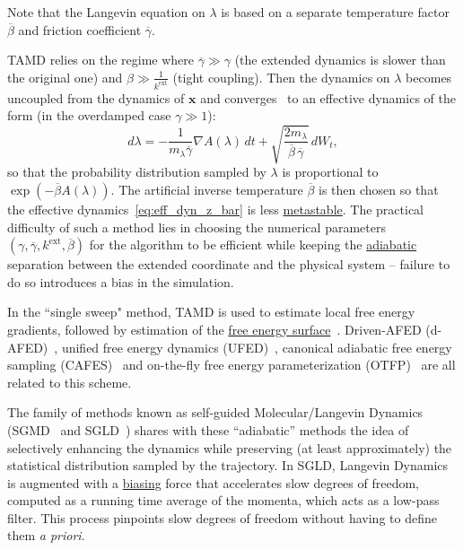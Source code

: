 \documentclass[9pt,review]{livecoms}
\newcommand{\vx}{\mathbf{x}}
\begin{document}
Note that the Langevin equation on $\lambda$ is based on a separate temperature factor $\overline \beta$ and friction coefficient $\overline{\gamma}$.

TAMD relies on the regime where $\overline{\gamma} \gg \gamma$ (the extended dynamics is slower than the original one) and $\beta \gg \frac{1}{k^\mathrm{ext}}$ (tight coupling). Then the dynamics on $\lambda$ becomes uncoupled from the dynamics of $\vx$ and converges~\cite{MV06} to an effective dynamics of the form (in the overdamped case $\gamma \gg 1$):
\begin{equation}\label{eq:eff_dyn_z_bar}
d\lambda = - \frac{1}{ m_\lambda \overline{\gamma}} \nabla A(\lambda) \, dt + \sqrt{ \frac{2  m_\lambda}{\overline{\beta} \, \overline{\gamma}}} \, dW_t,
\end{equation}
so that the probability distribution sampled by $\lambda$ is proportional to $\exp(- \overline{\beta} A(\lambda))$. The artificial inverse temperature $\overline{\beta}$ is then chosen so that the effective dynamics~\eqref{eq:eff_dyn_z_bar} is less \hyperlink{ref:metastab} {metastable}.
The practical difficulty of such a method lies in  choosing the numerical parameters $(\gamma,\overline{\gamma},k^\mathrm{ext},\overline{\beta})$ for the algorithm to be efficient while keeping the \hyperlink{ref:AdiabaticDyn} {adiabatic} separation between the extended coordinate and the physical system -- failure to do so introduces a bias in the simulation.

In the ``single sweep" method, TAMD is used to estimate local free energy gradients, followed by estimation of the \hyperlink{ref:FES} {free energy surface}~\cite{Maragliano2008}.
Driven-AFED (d-AFED)~\cite{doi:10.1021/jp805039u}, unified free energy dynamics (UFED)~\cite{doi:10.1063/1.4733389}, canonical adiabatic free energy sampling (CAFES)~\cite{doi:10.1021/jp013346k} and on-the-fly free energy parameterization (OTFP)~\cite{ABRAMS2012114} are all related to this scheme.

The family of methods known as self-guided Molecular/Langevin Dynamics (SGMD~\cite{Wu1999SGMD} and SGLD~\cite{Wu2003_SGLD}) shares with these ``adiabatic'' methods the idea of selectively enhancing the dynamics while preserving (at least approximately) the statistical distribution sampled by the trajectory.
In SGLD, Langevin Dynamics is augmented with a \hyperlink{ref:biasingE} {biasing} force that accelerates slow degrees of freedom, computed as a running time average of the momenta, which acts as a low-pass filter. This process pinpoints slow degrees of freedom without having to define them \textit{a priori}.
\end{document}
